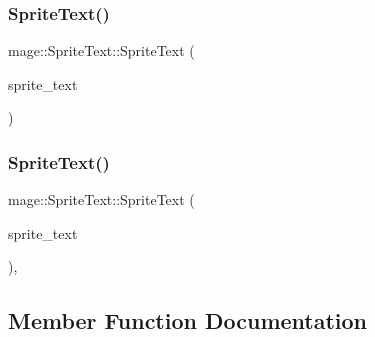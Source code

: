 \hypertarget{classmage_1_1_sprite_text_a3e56a7882dd714a6d8f2452d4f7071ff}{}\label{classmage_1_1_sprite_text_a3e56a7882dd714a6d8f2452d4f7071ff} 
\subsubsection{\texorpdfstring{Sprite\+Text()}{SpriteText()}\hspace{0.1cm}{\footnotesize\ttfamily [2/3]}}
{\footnotesize\ttfamily mage\+::\+Sprite\+Text\+::\+Sprite\+Text (\begin{DoxyParamCaption}\item[{const \hyperlink{classmage_1_1_sprite_text}{Sprite\+Text} \&}]{sprite\+\_\+text }\end{DoxyParamCaption})\hspace{0.3cm}{\ttfamily [protected]}}

\hypertarget{classmage_1_1_sprite_text_ab569dfa4ff5a30f0a23005c43635aad7}{}\label{classmage_1_1_sprite_text_ab569dfa4ff5a30f0a23005c43635aad7} 
\subsubsection{\texorpdfstring{Sprite\+Text()}{SpriteText()}\hspace{0.1cm}{\footnotesize\ttfamily [3/3]}}
{\footnotesize\ttfamily mage\+::\+Sprite\+Text\+::\+Sprite\+Text (\begin{DoxyParamCaption}\item[{\hyperlink{classmage_1_1_sprite_text}{Sprite\+Text} \&\&}]{sprite\+\_\+text }\end{DoxyParamCaption})\hspace{0.3cm}{\ttfamily [protected]}, {\ttfamily [default]}}



\subsection{Member Function Documentation}
\hypertarget{classmage_1_1_sprite_text_ac4edf927911a9fb8e5c3a674b217637a}{}\label{classmage_1_1_sprite_text_ac4edf927911a9fb8e5c3a674b217637a} 
